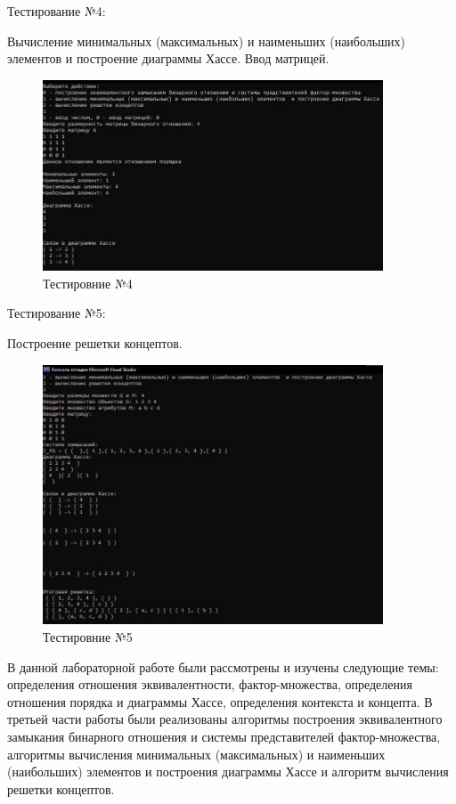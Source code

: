 \documentclass[bachelor, och, labwork]{shiza}
\begin{document}
		Тестирование №4:
	
	Вычисление минимальных (максимальных) и наименьших (наибольших) элементов  и построение диаграммы Хассе. Ввод матрицей.
	
	
	\begin{figure}[H]
		\centering
		\includegraphics[width=0.9\textwidth]{test_4}
		\caption{Тестировние №4}
		\label{fig:test_4}
	\end{figure}
	
		Тестирование №5:
	
	Построение решетки концептов.
	
	
	\begin{figure}[H]
		\centering
		\includegraphics[width=0.9\textwidth]{test_5}
		\caption{Тестировние №5}
		\label{fig:test_5}
	\end{figure}
		
	\newpage
	\conclusion %
	
	В данной лабораторной работе были рассмотрены и изучены следующие темы: определения отношения эквивалентности, фактор-множества, определения отношения порядка и диаграммы Хассе, определения контекста и концепта. В третьей части работы были реализованы алгоритмы построения эквивалентного замыкания бинарного отношения и системы представителей фактор-множества, алгоритмы вычисления минимальных (максимальных) и наименьших (наибольших) элементов  и построения диаграммы Хассе и алгоритм вычисления решетки концептов.
	
	
	
\end{document}
